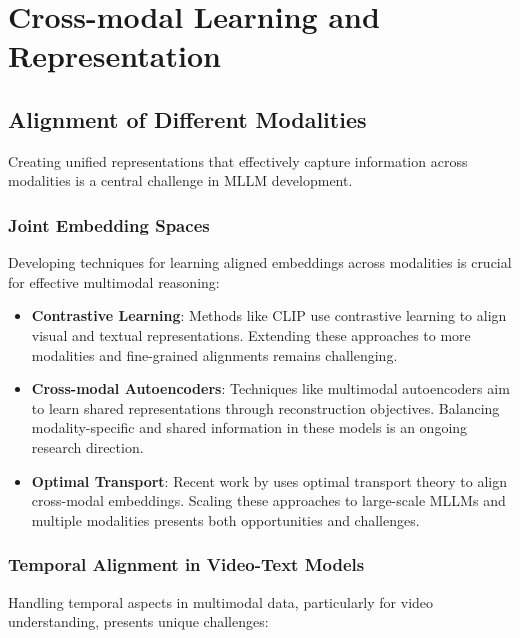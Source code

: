 \section{Cross-modal Learning and Representation}

\subsection{Alignment of Different Modalities}
Creating unified representations that effectively capture information across modalities is a central challenge in MLLM development.

\subsubsection{Joint Embedding Spaces}
Developing techniques for learning aligned embeddings across modalities is crucial for effective multimodal reasoning:

\begin{itemize}
    \item \textbf{Contrastive Learning}: Methods like CLIP \citep{radford2021learning} use contrastive learning to align visual and textual representations. Extending these approaches to more modalities and fine-grained alignments remains challenging.
    
    \item \textbf{Cross-modal Autoencoders}: Techniques like multimodal autoencoders \citep{ngiam2011multimodal} aim to learn shared representations through reconstruction objectives. Balancing modality-specific and shared information in these models is an ongoing research direction.
    
    \item \textbf{Optimal Transport}: Recent work by \citet{chen2020optimal} uses optimal transport theory to align cross-modal embeddings. Scaling these approaches to large-scale MLLMs and multiple modalities presents both opportunities and challenges.
\end{itemize}

\subsubsection{Temporal Alignment in Video-Text Models}
Handling temporal aspects in multimodal data, particularly for video understanding, presents unique challenges:

